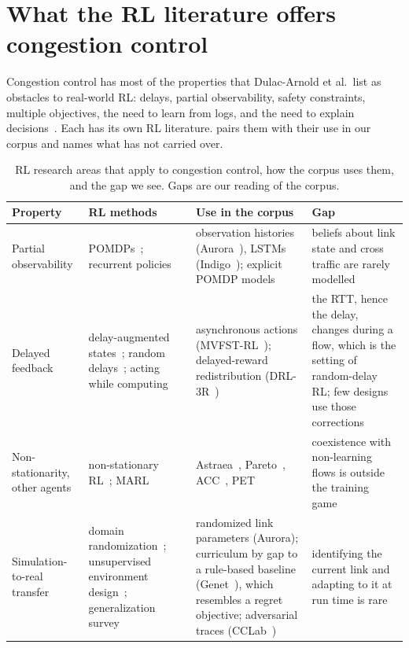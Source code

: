 \section{What the RL literature offers congestion control}
\label{sec:rl-cc-map}

Congestion control has most of the properties that Dulac-Arnold et al.\ list as obstacles to real-world RL: delays, partial observability, safety constraints, multiple objectives, the need to learn from logs, and the need to explain decisions~\cite{dulacarnold2021challenges}. Each has its own RL literature.  pairs them with their use in our corpus and names what has not carried over.

\begin{table}[t]
\centering
\caption{RL research areas that apply to congestion control, how the corpus uses them, and the gap we see. Gaps are our reading of the corpus.}
\label{tab:rl-map}
\scriptsize
\setlength{\tabcolsep}{3pt}
\begin{tabularx}{\linewidth}{@{}L{2.2cm}L{3.5cm}L{4.0cm}Y@{}}
\toprule
Property & RL methods & Use in the corpus & Gap \\
\midrule
Partial observability & POMDPs~\cite{kaelbling1998planning}; recurrent policies & observation histories (Aurora~\cite{jay2019aurora}), LSTMs (Indigo~\cite{yan2018pantheon}); explicit POMDP models~\cite{xue2026taming,khairy2026human} & beliefs about link state and cross traffic are rarely modelled \\
Delayed feedback & delay-augmented states~\cite{walsh2009learning}; random delays~\cite{ramstedt2021reinforcement}; acting while computing~\cite{ramstedt2019real} & asynchronous actions (MVFST-RL~\cite{sivakumar2019mvfst}); delayed-reward redistribution (DRL-3R~\cite{chen2021ran}) & the RTT, hence the delay, changes during a flow, which is the setting of random-delay RL; few designs use those corrections \\
Non-stationarity, other agents & non-stationary RL~\cite{padakandla2021survey}; MARL~\cite{zhang2021multi,lowe2017maddpg,yu2022mappo} & Astraea~\cite{liao2024astraea}, Pareto~\cite{emara2022pareto}, ACC~\cite{yan2021acc}, PET~\cite{cheng2024pet} & coexistence with non-learning flows is outside the training game \\
Simulation-to-real transfer & domain randomization~\cite{tobin2017domain,peng2018sim}; unsupervised environment design~\cite{dennis2020emergent}; generalization survey~\cite{kirk2023survey} & randomized link parameters (Aurora); curriculum by gap to a rule-based baseline (Genet~\cite{xia2022genet}), which resembles a regret objective; adversarial traces (CCLab~\cite{chen2026cclab}) & identifying the current link and adapting to it at run time is rare \\

\end{tabularx}
\end{table}
